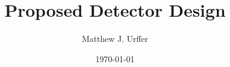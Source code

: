 \documentclass[]{report}
\title{Proposed Detector Design}
\author{Matthew J. Urffer}
\date{\today}
\begin{document}
\maketitle

\listoftodos




\end{document}
